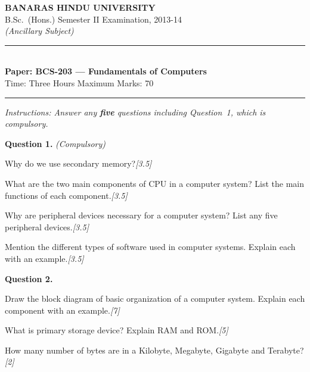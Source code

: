 \documentclass[11pt,a4paper]{article}
\newcommand{\pts}[1]{\hfill\textit{[#1]}}
\begin{document}
\begin{center}
  {\large\bfseries BANARAS HINDU UNIVERSITY}\\[2pt]
  {\normalsize B.Sc.\ (Hons.) Semester II Examination, 2013-14}\\[4pt]
  {\small\textit{(Ancillary Subject)}}\\[6pt]
  \rule{0.8\linewidth}{0.5pt}\\[6pt]
  {\large\bfseries Paper: BCS-203 --- Fundamentals of Computers}\\[4pt]
  {\normalsize Time: Three Hours \hfill Maximum Marks: 70}
\end{center}

\rule{\linewidth}{0.4pt}

\smallskip
\noindent\textit{Instructions: Answer any \textbf{five} questions including Question~1, which is compulsory.}

\bigskip

\noindent\textbf{Question 1.} \textit{(Compulsory)}
\begin{parts}
  \item Why do we use secondary memory?\pts{3.5}
  \item What are the two main components of CPU in a computer system? List the main functions of each component.\pts{3.5}
  \item Why are peripheral devices necessary for a computer system? List any five peripheral devices.\pts{3.5}
  \item Mention the different types of software used in computer systems. Explain each with an example.\pts{3.5}
\end{parts}

\bigskip

\noindent\textbf{Question 2.}
\begin{parts}
  \item Draw the block diagram of basic organization of a computer system. Explain each component with an example.\pts{7}
  \item What is primary storage device? Explain RAM and ROM.\pts{5}
  \item How many number of bytes are in a Kilobyte, Megabyte, Gigabyte and Terabyte?\pts{2}
\end{parts}

\bigskip
\end{document}
